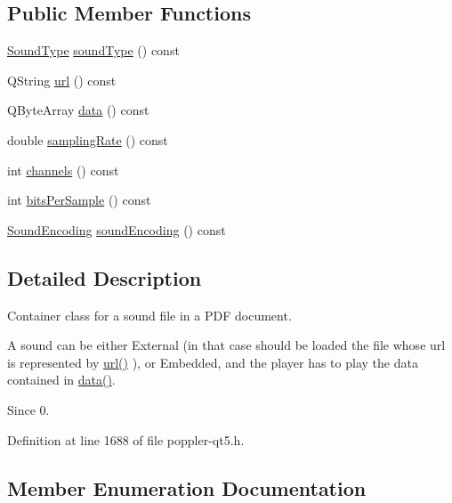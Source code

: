 \subsection*{Public Member Functions}
\begin{DoxyCompactItemize}
\item 
\hyperlink{class_poppler_1_1_sound_object_ac9f524c6c40abcbb1c9e09c29e020c5b}{Sound\+Type} \hyperlink{class_poppler_1_1_sound_object_ad9a6846519683cb82dec300f4f7877b2}{sound\+Type} () const
\item 
Q\+String \hyperlink{class_poppler_1_1_sound_object_a9c637ebe5e555586f4e42e32777646ec}{url} () const
\item 
Q\+Byte\+Array \hyperlink{class_poppler_1_1_sound_object_ae314846926ed860809e3651607a52bec}{data} () const
\item 
double \hyperlink{class_poppler_1_1_sound_object_a0cc54219ef559185946eb8668f162424}{sampling\+Rate} () const
\item 
int \hyperlink{class_poppler_1_1_sound_object_a58739de86624f0c4f0f3a72da77862e4}{channels} () const
\item 
int \hyperlink{class_poppler_1_1_sound_object_ad52ff1d6ee6418cb89adb68c730decfa}{bits\+Per\+Sample} () const
\item 
\hyperlink{class_poppler_1_1_sound_object_ac59f867ef18ebd7f3a85dec136f04640}{Sound\+Encoding} \hyperlink{class_poppler_1_1_sound_object_af20191df564f702e158fdef2c6dea7a1}{sound\+Encoding} () const
\end{DoxyCompactItemize}


\subsection{Detailed Description}
Container class for a sound file in a P\+DF document.

A sound can be either External (in that case should be loaded the file whose url is represented by \hyperlink{class_poppler_1_1_sound_object_a9c637ebe5e555586f4e42e32777646ec}{url()} ), or Embedded, and the player has to play the data contained in \hyperlink{class_poppler_1_1_sound_object_ae314846926ed860809e3651607a52bec}{data()}.

\begin{DoxySince}{Since}
0. 
\end{DoxySince}


Definition at line 1688 of file poppler-\/qt5.\+h.



\subsection{Member Enumeration Documentation}
\mbox{\label{class_poppler_1_1_sound_object_ac59f867ef18ebd7f3a85dec136f04640}} 

